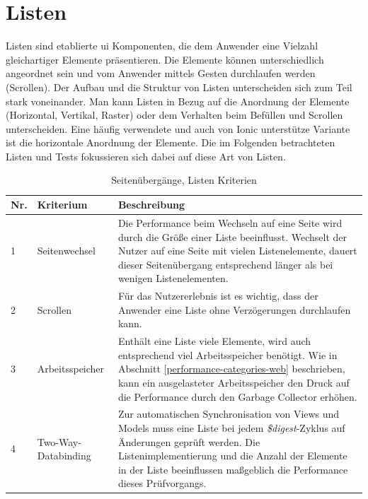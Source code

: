 \section{Listen}
\label{lists-main}
Listen sind etablierte \gls{ui} Komponenten, die dem Anwender eine Vielzahl gleichartiger Elemente präsentieren. Die Elemente können unterschiedlich angeordnet sein und vom Anwender mittels Gesten durchlaufen werden (Scrollen). Der Aufbau und die Struktur von Listen unterscheiden sich zum Teil stark voneinander. Man kann Listen in Bezug auf die Anordnung der Elemente (Horizontal, Vertikal, Raster) oder dem Verhalten beim Befüllen und Scrollen unterscheiden. Eine häufig verwendete und auch von Ionic unterstütze Variante ist die horizontale Anordnung der Elemente. Die im Folgenden betrachteten Listen und Tests fokussieren sich dabei auf diese Art von Listen.
\begin{table}[h]
	\centering
	\begin{tabular}{llp{8cm}}
		\textbf{Nr.} & \textbf{Kriterium} & \textbf{Beschreibung}\\
		\hline
		1 & Seitenwechsel & Die Performance beim Wechseln auf eine Seite wird durch die Größe einer Liste beeinflusst. Wechselt der Nutzer auf eine Seite mit vielen Listenelemente, dauert dieser Seitenübergang entsprechend länger als bei wenigen Listenelementen.\\
		2 & Scrollen & Für das Nutzererlebnis ist es wichtig, dass der Anwender eine Liste ohne Verzögerungen durchlaufen kann.\\
		3 & Arbeitsspeicher & Enthält eine Liste viele Elemente, wird auch entsprechend viel Arbeitsspeicher benötigt. Wie in Abschnitt \ref{performance-categories-web} beschrieben, kann ein ausgelasteter Arbeitsspeicher den Druck auf die Performance durch den Garbage Collector erhöhen.\\
		4 & Two-Way-Databinding & Zur automatischen Synchronisation von Views und Models muss eine Liste bei jedem \emph{\$digest}-Zyklus auf Änderungen geprüft werden. Die Listenimplementierung und die Anzahl der Elemente in der Liste beeinflussen maßgeblich die Performance dieses Prüfvorgangs.\\
	\end{tabular}
	\caption{Seitenübergänge, Listen Kriterien}
	\label{su-lists-criterias}	
\end{table}
\\\\
